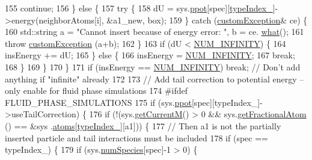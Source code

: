\begin{DoxyCode}
155                     \textcolor{keywordflow}{continue};
156                 \} \textcolor{keywordflow}{else} \{
157                     \textcolor{keywordflow}{try} \{
158                         dU = sys.\hyperlink{classsim_system_ad2e290b5963f132e6a3a56cee35c8e9f}{ppot}[spec][\hyperlink{classmc_move_acb731965547b0326ef318ec96da8b46a}{typeIndex\_}]->energy(neighborAtoms[i], &a1\_new, 
      box);
159                     \} \textcolor{keywordflow}{catch} (\hyperlink{classcustom_exception}{customException}& ce) \{
160                         std::string a = \textcolor{stringliteral}{"Cannot insert because of energy error: "}, b = ce.
      \hyperlink{classcustom_exception_aeb6ab5848b038adfc68fde86a512f691}{what}();
161                         \textcolor{keywordflow}{throw} \hyperlink{classcustom_exception}{customException} (a+b);
162                     \}
163                     \textcolor{keywordflow}{if} (dU < \hyperlink{potentials_8h_ab94ab1d09e2291d03fe92a0e24a9d33b}{NUM\_INFINITY}) \{
164                         insEnergy += dU;
165                     \} \textcolor{keywordflow}{else} \{
166                         insEnergy = \hyperlink{potentials_8h_ab94ab1d09e2291d03fe92a0e24a9d33b}{NUM\_INFINITY};
167                         \textcolor{keywordflow}{break};
168                     \}
169                 \}
170             \}
171             \textcolor{keywordflow}{if} (insEnergy == \hyperlink{potentials_8h_ab94ab1d09e2291d03fe92a0e24a9d33b}{NUM\_INFINITY}) \textcolor{keywordflow}{break}; \textcolor{comment}{// Don't add anything if "infinite" already}
172 
173             \textcolor{comment}{// Add tail correction to potential energy -- only enable for fluid phase simulations}
174 \textcolor{preprocessor}{    #ifdef FLUID\_PHASE\_SIMULATIONS}
175 \textcolor{preprocessor}{}            \textcolor{keywordflow}{if} (sys.\hyperlink{classsim_system_ad2e290b5963f132e6a3a56cee35c8e9f}{ppot}[spec][typeIndex\_]->useTailCorrection) \{
176                 \textcolor{keywordflow}{if} (!(sys.\hyperlink{classsim_system_a299fe4372e610b554eaaf5f5957b2dbc}{getCurrentM}() > 0 && sys.\hyperlink{classsim_system_a2ab77377c60e0e3109a6e875690b0ab7}{getFractionalAtom} () == &sys
      .\hyperlink{classsim_system_a90421b19082f7fb8fc23b7264b1161e4}{atoms}[\hyperlink{classmc_move_acb731965547b0326ef318ec96da8b46a}{typeIndex\_}][a1])) \{
177                     \textcolor{comment}{// Then a1 is not the partially inserted particle and tail interactions must be
       included}
178                     \textcolor{keywordflow}{if} (spec == typeIndex\_) \{
179                         \textcolor{keywordflow}{if} (sys.\hyperlink{classsim_system_a9eea865e6dc1cff377b1e79c4d9c23f0}{numSpecies}[spec]-1 > 0) \{

\end{DoxyCode}
